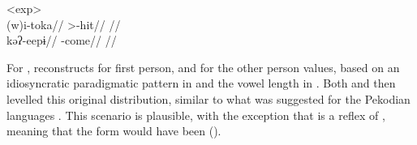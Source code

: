 \pex<exp>
 \akuriyo \parencite[][86]{gildea1994akuriyo}\\
\begingl
\gla (w)i-toka//
\glb {}>-hit//
\glft {}//
\endgl
{} \akuriyo \parencite[][114]{meira1998proto}\\
\begingl
\gla kəʔ-eepɨ//
\glb {}-come//
\glft {}//
\endgl
\xe
%
%
%
%

For , \textcite[114--115]{meira1998proto} reconstructs \PTar {} for first person, and  for the other person values, based on an idiosyncratic paradigmatic pattern in \trio and the vowel length in \akuriyo.
Both \akuriyo and \carijo then levelled this original distribution, similar to what was suggested for the Pekodian languages .
This scenario is plausible, with the exception that \trio {} is a reflex of  , meaning that the \PTir form would have been  (\PTar {}).

%

